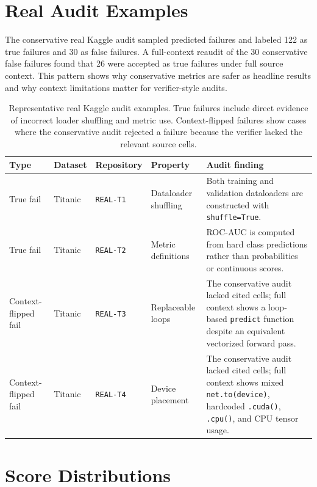 \documentclass[11pt]{article}
\begin{document}
\section{Real Audit Examples}
\label{sec:real-audit}

The conservative real Kaggle audit sampled predicted failures and labeled 122 as true failures and 30 as false failures.
A full-context reaudit of the 30 conservative false failures found that 26 were accepted as true failures under full source context.
This pattern shows why conservative metrics are safer as headline results and why context limitations matter for verifier-style audits.

\begin{table}[t]
  \centering
  \small
  \begin{tabular}{llllp{6.0cm}}
    \toprule
    Type & Dataset & Repository & Property & Audit finding \\
    \midrule
    True fail & Titanic & \texttt{REAL-T1} & Dataloader shuffling & Both training and validation dataloaders are constructed with \texttt{shuffle=True}. \\
    True fail & Titanic & \texttt{REAL-T2} & Metric definitions & ROC-AUC is computed from hard class predictions rather than probabilities or continuous scores. \\
    Context-flipped fail & Titanic & \texttt{REAL-T3} & Replaceable loops & The conservative audit lacked cited cells; full context shows a loop-based \texttt{predict} function despite an equivalent vectorized forward pass. \\
    Context-flipped fail & Titanic & \texttt{REAL-T4} & Device placement & The conservative audit lacked cited cells; full context shows mixed \texttt{net.to(device)}, hardcoded \texttt{.cuda()}, \texttt{.cpu()}, and CPU tensor usage. \\
    \bottomrule
  \end{tabular}
  \caption{Representative real Kaggle audit examples. True failures include direct evidence of incorrect loader shuffling and metric use. Context-flipped failures show cases where the conservative audit rejected a failure because the verifier lacked the relevant source cells.}
  \label{tab:real-examples}
\end{table}

\section{Score Distributions}
\label{sec:scores}
\end{document}
